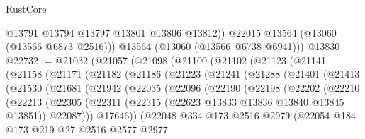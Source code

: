 \begin{lexlean}{RustCore}
\begin{coremodule}
            @13791
            @13794
            @13797
            @13801
            @13806
            @13812))
        @22015
        @13564
        (@13060 (@13566 @6873 @2516)))
      @13564
      (@13060 (@13566 @6738 @6941)))
    @13830
@22732 := @21032
    (@21057
      (@21098
        (@21100
          (@21102
            (@21123
              (@21141
                (@21158
                  (@21171
                    (@21182
                      (@21186
                        (@21223
                          (@21241
                            (@21288
                              (@21401
                                (@21413
                                  (@21530
                                    (@21681
                                      (@21942
                                        (@22035
                                          (@22096
                                            (@22190
                                              (@22198
                                                (@22202
                                                  (@22210
                                                    (@22213
                                                      (@22305
                                                        (@22311
                                                          (@22315
                                                            (@22623
                                                              @13833
                                                              @13836
                                                              @13840
                                                              @13845
                                                              @13851))
                                                          @22087)))
                                                    @17646))
                                                (@22048
                                                  @334
                                                  @173
                                                  @2516
                                                  @2979
                                                  (@22054
                                                    @184
                                                    @173
                                                    @219
                                                    @27
                                                    @2516
                                                    @2577
                                                    @2977

\end{coremodule}
\end{lexlean}
